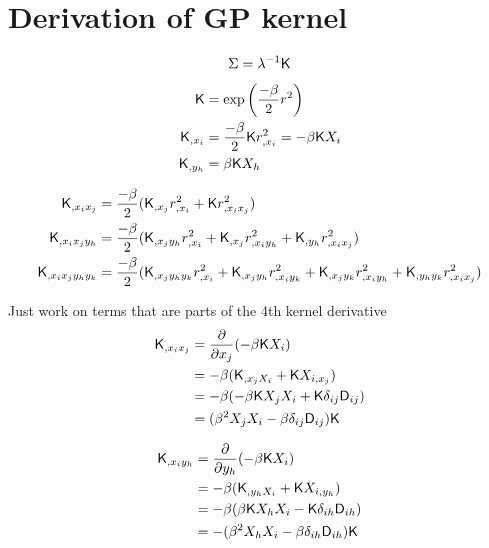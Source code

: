 \appendix 

\section{Derivation of GP kernel}
\begin{equation*}
\Sigma = \lambda^{-1} \mathsf{K} 
\end{equation*}

\begin{align}
\mathsf{K} &= \exp{\left(\frac{-\beta}{2} r^2 \right)}\\
\mathsf{K}_{,x_i} &= \frac{-\beta}{2} \mathsf{K} r^2_{,x_i} = -\beta \mathsf{K} X_i\\ 
\mathsf{K}_{,y_h} &= \beta \mathsf{K} X_h 
\end{align}

\begin{align}
\mathsf{K}_{,x_i x_j} &= \frac{-\beta}{2}(\mathsf{K}_{,x_j} r^2_{,x_i} + \mathsf{K} r^2_{,x_i x_j})\\
\mathsf{K}_{,x_i x_j y_h} &= \frac{-\beta}{2}(\mathsf{K}_{,x_j y_h} r^2_{,x_i} + \mathsf{K}_{,x_j}
r^2_{,x_i y_h} + \mathsf{K}_{,y_h} r^2_{,x_i x_j})\\
\mathsf{K}_{,x_i x_j y_h y_k} &= \frac{-\beta}{2} 
(\mathsf{K}_{,x_j y_h y_k} r^2_{,x_i} +
\mathsf{K}_{,x_j y_h} r^2_{,x_i y_k} + 
\mathsf{K}_{,x_j y_k} r^2_{,x_i y_h} + 
\mathsf{K}_{,y_h y_k} r^2_{,x_i x_j} )
\label{eq:4th_derivative_intermediate_expression}
\end{align}

Just work on terms that are parts of the 4th kernel derivative 
\begin{align*}
\mathsf{K}_{,x_i x_j} &= \frac{\partial}{\partial x_j} (-\beta \mathsf{K} X_i)\\
&= -\beta(\mathsf{K}_{,x_j X_i} + \mathsf{K} X_{i, x_j})\\ 
&= -\beta(-\beta \mathsf{K} X_j X_i + \mathsf{K} \delta_{ij} \mathsf{D}_{ij}) \\ 
&= (\beta^2 X_j X_i - \beta \delta_{ij} \mathsf{D}_{ij})\mathsf{K} 
\end{align*}

\begin{align*}
\mathsf{K}_{,x_i y_h} &= \frac{\partial}{\partial y_h} (-\beta \mathsf{K} X_i)\\
&= -\beta(\mathsf{K}_{,y_h X_i} + \mathsf{K} X_{i, y_h})\\ 
&= -\beta(\beta \mathsf{K} X_h X_i - \mathsf{K} \delta_{ih} \mathsf{D}_{ih}) \\ 
&= -(\beta^2 X_h X_i - \beta \delta_{ih} \mathsf{D}_{ih})\mathsf{K} 
\end{align*}

